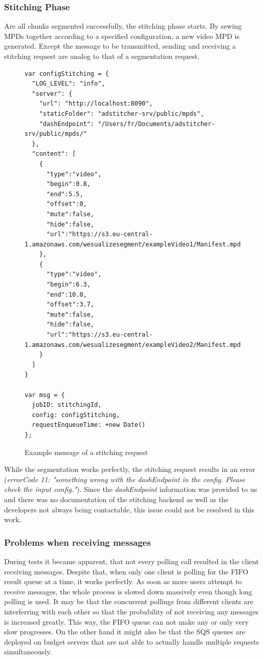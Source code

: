 \documentclass[conference]{IEEEtran}
\begin{document}
\subsubsection{Stitching Phase}
Are all chunks segmented successfully, the stitching phase starts.
By sewing MPDs together according to a specified configuration, a new video MPD is generated.
Except the message to be transmitted, sending and receiving a stitching request are analog to that of a segmentation request.
\begin{figure}[H]
\begin{lstlisting}
var configStitching = {
  "LOG_LEVEL": "info",
  "server": {
    "url": "http://localhost:8090",
    "staticFolder": "adstitcher-srv/public/mpds",
    "dashEndpoint": "/Users/fr/Documents/adstitcher-srv/public/mpds/"
  },
  "content": [
    {
      "type":"video",
      "begin":0.8,
      "end":5.5,
      "offset":0,
      "mute":false,
      "hide":false,
      "url":"https://s3.eu-central-1.amazonaws.com/wesualizesegment/exampleVideo1/Manifest.mpd"
    },
    {
      "type":"video",
      "begin":6.3,
      "end":10.0,
      "offset":3.7,
      "mute":false,
      "hide":false,
      "url":"https://s3.eu-central-1.amazonaws.com/wesualizesegment/exampleVideo2/Manifest.mpd"
    }
  ]
}

var msg = {
  jobID: stitchingId,
  config: configStitching,
  requestEnqueueTime: +new Date()
};
\end{lstlisting}
\caption{Example message of a stitching request}
\end{figure}
While the segmentation works perfectly, the stitching request results in an error (\textit{errorCode 11: "something wrong with the dashEndpoint in the config. Please check the input config."}).
Since the \textit{dashEndpoint} information was provided to us and there was no documentation of the stitching backend as well as the developers not always being contactable, this issue could not be resolved in this work.
\\
\subsubsection{Problems when receiving messages}
During tests it became apparent, that not every polling call resulted in the client receiving messages.
Despite that, when only one client is polling for the FIFO result queue at a time, it works perfectly.
As soon as more users attempt to receive messages, the whole process is slowed down massively even though long polling is used.
It may be that the concurrent pollings from different clients are interferring with each other so that the probability of not receiving any messages is increased greatly.
This way, the FIFO queue can not make any or only very slow progresses.
On the other hand it might also be that the SQS queues are deployed on budget servers that are not able to actually handle multiple requests simultaneously.
\end{document}
